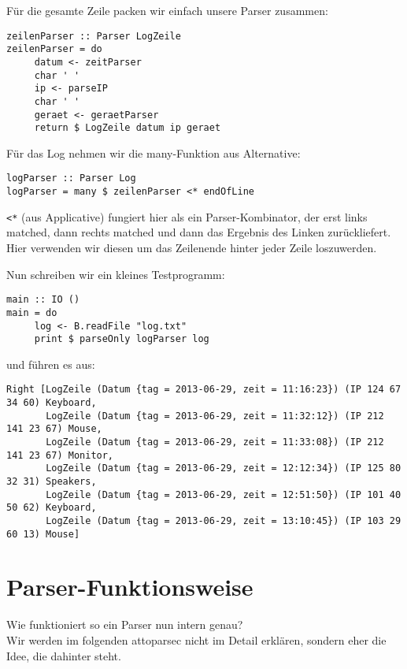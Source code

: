 \documentclass{beamer}
\begin{document}
\begin{frame}[fragile]
Für die gesamte Zeile packen wir einfach unsere Parser zusammen:
\small
\begin{verbatim}
zeilenParser :: Parser LogZeile
zeilenParser = do
     datum <- zeitParser
     char ' '
     ip <- parseIP
     char ' '
     geraet <- geraetParser
     return $ LogZeile datum ip geraet
\end{verbatim}
\normalsize
\end{frame}

\begin{frame}[fragile]
Für das Log nehmen wir die many-Funktion aus \glqq Alternative\grqq :
\begin{verbatim}
logParser :: Parser Log
logParser = many $ zeilenParser <* endOfLine
\end{verbatim}
\texttt{<*} (aus Applicative) fungiert hier als ein Parser-Kombinator, der erst links matched, dann rechts matched und dann das Ergebnis des Linken zurückliefert.\\
Hier verwenden wir diesen um das Zeilenende hinter jeder Zeile loszuwerden.
\end{frame}

\begin{frame}[fragile]
Nun schreiben wir ein kleines Testprogramm:
\begin{verbatim}
main :: IO ()
main = do
     log <- B.readFile "log.txt"
     print $ parseOnly logParser log
\end{verbatim}
und führen es aus:
\tiny
\begin{verbatim}
Right [LogZeile (Datum {tag = 2013-06-29, zeit = 11:16:23}) (IP 124 67 34 60) Keyboard,
       LogZeile (Datum {tag = 2013-06-29, zeit = 11:32:12}) (IP 212 141 23 67) Mouse,
       LogZeile (Datum {tag = 2013-06-29, zeit = 11:33:08}) (IP 212 141 23 67) Monitor,
       LogZeile (Datum {tag = 2013-06-29, zeit = 12:12:34}) (IP 125 80 32 31) Speakers,
       LogZeile (Datum {tag = 2013-06-29, zeit = 12:51:50}) (IP 101 40 50 62) Keyboard,
       LogZeile (Datum {tag = 2013-06-29, zeit = 13:10:45}) (IP 103 29 60 13) Mouse]
\end{verbatim}
\normalsize

\end{frame}

\section{Parser-Funktionsweise}
\begin{frame}[fragile]
Wie funktioniert so ein Parser nun intern genau?\\
\bigskip
Wir werden im folgenden attoparsec nicht im Detail erklären, sondern eher die Idee, die dahinter steht.
\end{frame}
\end{document}
